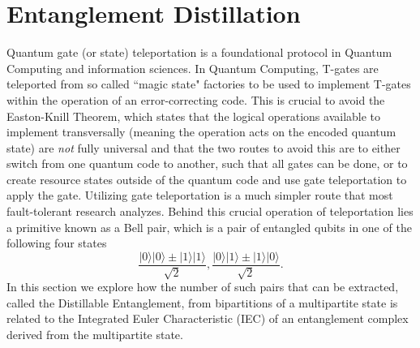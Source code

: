 \documentclass{article}
\DeclareMathOperator{\Tr}{Tr}
\newcommand{\ket}[1]{|#1\rangle}
\newcommand{\bra}[1]{\langle #1|}
\begin{document}




\section{Entanglement Distillation} \label{sec:distillable_entanglement}
Quantum gate (or state) teleportation is a foundational protocol in Quantum Computing and information sciences. In Quantum Computing, T-gates are teleported from so called ``magic state" factories to be used to implement T-gates within the operation of an error-correcting code. This is crucial to avoid the Easton-Knill Theorem, which states that the logical operations available to implement transversally (meaning the operation acts on the encoded quantum state) are \emph{not} fully universal and that the two routes to avoid this are to either switch from one quantum code to another, such that all gates can be done, or to create resource states outside of the quantum code and use gate teleportation to apply the gate. Utilizing gate teleportation is a much simpler route that most fault-tolerant research analyzes. Behind this crucial operation of teleportation lies a  primitive known as a Bell pair, which is a pair of entangled qubits in one of the following four states
\begin{equation}
    \frac{\ket{0}\ket{0} \pm \ket{1}\ket{1}}{\sqrt{2}}, \frac{\ket{0}\ket{1} \pm \ket{1}\ket{0}}{\sqrt{2}}. 
\end{equation}
In this section we explore how the number of such pairs that can be extracted, called the Distillable Entanglement, from bipartitions of a multipartite state is related to the Integrated Euler Characteristic (IEC) of an entanglement complex derived from the multipartite state.
\end{document}
